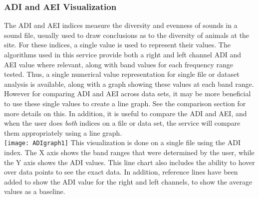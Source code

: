 \subsubsection{ADI and AEI Visualization}
The ADI and AEI indices measure the diversity and evenness of sounds in a sound file, usually used to draw conclusions as to the diversity of animals at the site. For these indices, a single value is used to represent their values. The algorithms used in this service provide both a right and left channel ADI and AEI value where relevant, along with band values for each frequency range tested. Thus, a single numerical value representation for single file or dataset analysis is available, along with a graph showing these values at each band range. However for comparing ADI and AEI across data sets, it may be more beneficial to use these single values to create a line graph. See the comparison section for more details on this. In addition, it is useful to compare the ADI and AEI, and when the user does \textit{both} indices on a file or data set, the service will compare them appropriately using a line graph.\\

\texttt{[image: ADIgraph1]}
This visualization is done on a single file using the ADI index. The X axis shows the band ranges that were determined by the user, while the Y axis shows the ADI values. This line chart also includes the ability to hover over data points to see the exact data. In addition, reference lines have been added to show the ADI value for the right and left channels, to show the average values as a baseline.
